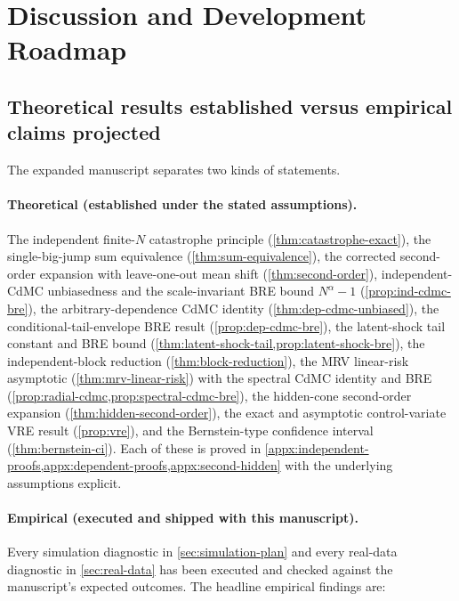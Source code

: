 \section{Discussion and Development Roadmap}
\label{sec:discussion}

\subsection{Theoretical results established versus empirical claims projected}

The expanded manuscript separates two kinds of statements.

\paragraph{Theoretical (established under the stated assumptions).}
The independent finite-$N$ catastrophe principle
(\cref{thm:catastrophe-exact}), the single-big-jump sum equivalence
(\cref{thm:sum-equivalence}), the corrected second-order expansion with
leave-one-out mean shift (\cref{thm:second-order}), independent-CdMC
unbiasedness and the scale-invariant BRE bound $N^\alpha-1$
(\cref{prop:ind-cdmc-bre}), the arbitrary-dependence CdMC identity
(\cref{thm:dep-cdmc-unbiased}), the conditional-tail-envelope BRE result
(\cref{prop:dep-cdmc-bre}), the latent-shock tail constant and BRE bound
(\cref{thm:latent-shock-tail,prop:latent-shock-bre}), the independent-block
reduction (\cref{thm:block-reduction}), the MRV linear-risk asymptotic
(\cref{thm:mrv-linear-risk}) with the spectral CdMC identity and BRE
(\cref{prop:radial-cdmc,prop:spectral-cdmc-bre}), the hidden-cone second-order
expansion (\cref{thm:hidden-second-order}), the exact and asymptotic
control-variate VRE result (\cref{prop:vre}), and the Bernstein-type
confidence interval (\cref{thm:bernstein-ci}). Each of these is proved in
\cref{appx:independent-proofs,appx:dependent-proofs,appx:second-hidden} with
the underlying assumptions explicit.

\paragraph{Empirical (executed and shipped with this manuscript).}
Every simulation diagnostic in \cref{sec:simulation-plan} and every
real-data diagnostic in \cref{sec:real-data} has been executed and
checked against the manuscript's expected outcomes. The headline
empirical findings are:

